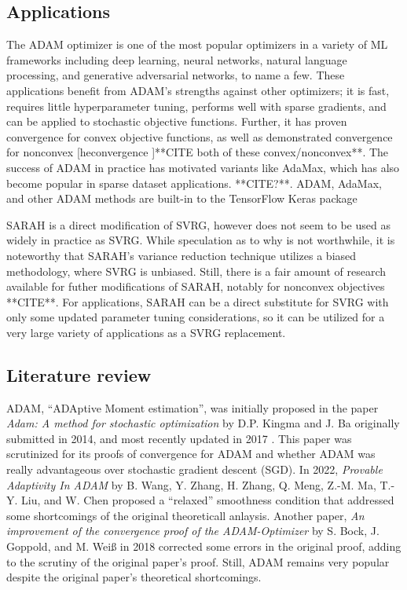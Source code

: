 \documentclass[letterpaper,11 pt]{article}
\begin{document}
\subsection{Applications} 
The ADAM optimizer is one of the most popular optimizers in a variety of ML frameworks including deep learning, neural networks, natural language processing, and generative adversarial networks, to name a few.  These applications benefit from ADAM’s strengths against other optimizers; it is fast, requires little hyperparameter tuning, performs well with sparse gradients, and can be applied to stochastic objective functions.  Further, it has proven convergence for convex objective functions, as well as demonstrated convergence for nonconvex [heconvergence ]**CITE both of these convex/nonconvex**.  The success of ADAM in practice has motivated variants like AdaMax, which has also become popular in sparse dataset applications. **CITE?**.  ADAM, AdaMax, and other ADAM methods are built-in to the TensorFlow Keras package \cite{tensorflow}

SARAH is a direct modification of SVRG, however does not seem to be used as widely in practice as SVRG.  While speculation as to why is not worthwhile, it is noteworthy that SARAH’s variance reduction technique utilizes a biased methodology, where SVRG is unbiased.  Still, there is a fair amount of research available for futher modifications of SARAH, notably for nonconvex objectives **CITE**.  For applications, SARAH can be a direct substitute for SVRG with only some updated parameter tuning considerations, so it can be utilized for a very large variety of applications as a SVRG replacement.

\subsection{ Literature review}

ADAM, “ADAptive Moment estimation”, was initially proposed in the paper \textit{Adam: A method for stochastic optimization} by D.P. Kingma and J. Ba originally submitted in 2014, and most recently updated in 2017 \cite{kingma}.  This paper was scrutinized for its proofs of convergence for ADAM and whether ADAM was really advantageous over stochastic gradient descent (SGD).  In 2022, \textit{Provable Adaptivity In ADAM} by B. Wang, Y. Zhang, H. Zhang, Q. Meng, Z.-M. Ma, T.-Y. Liu, and W. Chen \cite{wangprovable} proposed a “relaxed” smoothness condition that addressed some shortcomings of the original theoreticall anlaysis.  Another paper, \textit{An improvement of the convergence proof of the ADAM-Optimizer} by S. Bock, J. Goppold, and M. Weiß in 2018 \cite{inproceedings} corrected some errors in the original proof, adding to the scrutiny of the original paper’s proof.  Still, ADAM remains very popular despite the original paper's theoretical shortcomings. 
\end{document}

